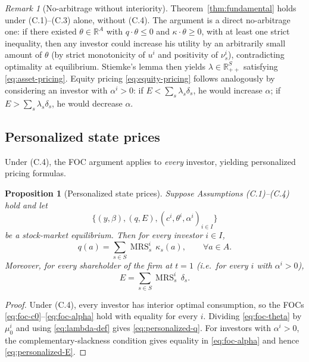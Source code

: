 \documentclass[11pt,a4paper]{article}
\def\R{\mathbb{R}}
\def\leq{\leqslant}
\def\geq{\geqslant}
\DeclareMathOperator{\MRS}{MRS}
\theoremstyle{plain}
\newtheorem{proposition}[theorem]{Proposition}
\theoremstyle{definition}
\theoremstyle{remark}
\newtheorem{remark}[theorem]{Remark}
\begin{document}
\begin{remark}[No-arbitrage without interiority]\label{rem:no-arbitrage}
Theorem~\ref{thm:fundamental} holds under (C.1)--(C.3) alone, without (C.4). The argument is a direct no-arbitrage one: if there existed $\theta\in\R^A$ with $q\cdot\theta\leq 0$ and $\kappa\cdot\theta\geq 0$, with at least one strict inequality, then any investor could increase his utility by an arbitrarily small amount of $\theta$ (by strict monotonicity of $u^i$ and positivity of $\nu^i_s$), contradicting optimality at equilibrium. Stiemke's lemma then yields $\lambda\in\R_{++}^S$ satisfying \eqref{eq:asset-pricing}. Equity pricing \eqref{eq:equity-pricing} follows analogously by considering an investor with $\alpha^i>0$: if $E<\sum_s\lambda_s\delta_s$, he would increase $\alpha$; if $E>\sum_s\lambda_s\delta_s$, he would decrease $\alpha$.
\end{remark}

\subsection{Personalized state prices}

Under (C.4), the FOC argument applies to \emph{every} investor, yielding personalized pricing formulas.

\begin{proposition}[Personalized state prices]\label{prop:personalized}
Suppose Assumptions \textup{(C.1)--(C.4)} hold and let
\[
  \bigl\{(y,\beta),(q,E),(c^i,\theta^i,\alpha^i)_{i\in I}\bigr\}
\]
be a stock-market equilibrium. Then for every investor $i\in I$,
\begin{equation}\label{eq:personalized-q}
  q(a) = \sum_{s\in S} \MRS^i_s\,\kappa_s(a),\qquad \forall a\in A.
\end{equation}
Moreover, for every shareholder of the firm at $t=1$ (i.e.\ for every $i$ with $\alpha^i>0$),
\begin{equation}\label{eq:personalized-E}
  E = \sum_{s\in S} \MRS^i_s\,\delta_s.
\end{equation}
\end{proposition}

\begin{proof}
Under (C.4), every investor has interior optimal consumption, so the FOCs \eqref{eq:foc-c0}--\eqref{eq:foc-alpha} hold with equality for every $i$. Dividing \eqref{eq:foc-theta} by $\mu^i_0$ and using \eqref{eq:lambda-def} gives \eqref{eq:personalized-q}. For investors with $\alpha^i>0$, the complementary-slackness condition gives equality in \eqref{eq:foc-alpha} and hence \eqref{eq:personalized-E}.
\end{proof}
\end{document}
